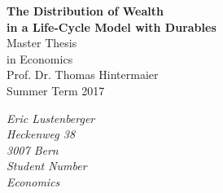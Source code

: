 \documentclass[a4paper,12pt]{article}
\begin{document}



\begin{titlepage}       %

\thispagestyle{empty}   %


\begin{center}
\vspace*{2.5cm}
{\bf  \Large The Distribution of Wealth \\in a Life-Cycle Model with Durables} \\
\vspace*{3cm} 
Master Thesis \\ in Economics \\
Prof. Dr. Thomas Hintermaier  \\
\vspace*{0.5cm} 
Summer Term 2017\\
\end{center}

\vfill
\begin{flushright}
   \emph{Eric Lustenberger} \\
    \emph{Heckenweg 38}\\
    \emph{3007 Bern}\\
   \emph{Student Number}\\
 \emph{Economics}\\

\end{flushright}



% 
% 
% 

\end{titlepage}

\newpage                %





% 
% 
\end{document}

